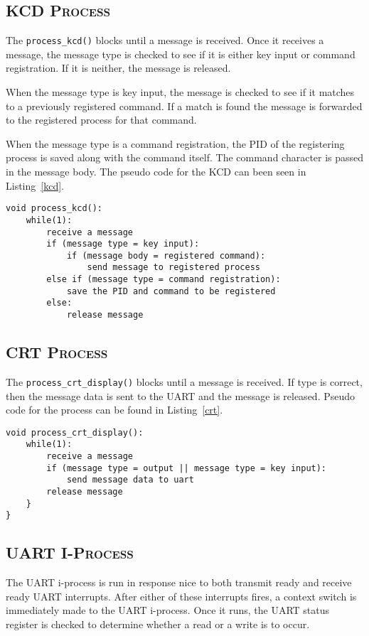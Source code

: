 \documentclass[oneside]{report}
\begin{document}
\subsection{\textsc{KCD Process}}
The \texttt{process\_kcd()} blocks until a message is received. Once it
receives a message, the message type is checked to see if it is either
key input or command registration. If it is neither, the message is
released. 

When the message type is key input, the message is checked to see if
it matches to a previously registered command. If a match is found the
message is forwarded to the registered process for that command.

When the message type is a command registration, the PID of the
registering process is saved along with the command itself. The
command character is passed in the message body. The pseudo code for
the KCD can been seen in Listing~\ref{kcd}.

\begin{lstlisting}
void process_kcd():
    while(1):
        receive a message
        if (message type = key input):
            if (message body = registered command):
                send message to registered process
        else if (message type = command registration):
            save the PID and command to be registered
        else:
            release message
\end{lstlisting}

\subsection{\textsc{CRT Process}}
The \texttt{process\_crt\_display()} blocks until a message is
received. If type is correct, then the message data is sent to the
UART and the message is released. Pseudo code for the
process can be found in Listing~\ref{crt}.

\begin{lstlisting}
void process_crt_display():
    while(1):
        receive a message
        if (message type = output || message type = key input):
            send message data to uart
        release message
    }
}
\end{lstlisting}

\subsection{\textsc{UART I-Process}}
The UART i-process is run in response nice to both transmit ready and
receive ready UART interrupts. After either of these interrupts fires,
a context switch is immediately made to the UART i-process. Once it
runs, the UART status register is checked to determine whether a read
or a write is to occur.
\end{document}

